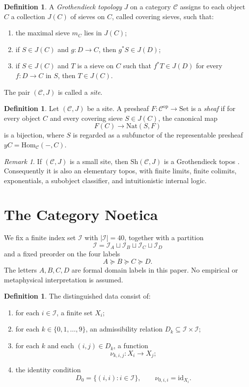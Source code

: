 \documentclass[11pt]{amsart}
\numberwithin{equation}{section}
\theoremstyle{definition}
\newtheorem{definition}[theorem]{Definition}
\theoremstyle{remark}
\newtheorem{remark}[theorem]{Remark}
\newcommand{\Sh}{\mathrm{Sh}}
\newcommand{\id}{\mathrm{id}}
\newcommand{\I}{\mathcal{I}}
\newcommand{\IA}{\mathcal{I}_A}
\newcommand{\IB}{\mathcal{I}_B}
\newcommand{\IC}{\mathcal{I}_C}
\newcommand{\ID}{\mathcal{I}_D}
\begin{document}
\begin{definition}
A \emph{Grothendieck topology} \(J\) on a category \(\mathcal{C}\) assigns to each object \(C\) a collection \(J(C)\) of sieves on \(C\), called covering sieves, such that:
\begin{enumerate}[label=(J\arabic*)]
\item \label{J1} the maximal sieve \(m_C\) lies in \(J(C)\);
\item \label{J2} if \(S \in J(C)\) and \(g : D \to C\), then \(g^{*}S \in J(D)\);
\item \label{J3} if \(S \in J(C)\) and \(T\) is a sieve on \(C\) such that \(f^{*}T \in J(D)\) for every \(f : D \to C\) in \(S\), then \(T \in J(C)\).
\end{enumerate}
The pair \((\mathcal{C},J)\) is called a \emph{site}.
\end{definition}

\begin{definition}
Let \((\mathcal{C},J)\) be a site. A presheaf \(F : \mathcal{C}^{\mathrm{op}} \to \mathrm{Set}\) is a \emph{sheaf} if for every object \(C\) and every covering sieve \(S \in J(C)\), the canonical map
\[
F(C) \longrightarrow \mathrm{Nat}(S,F)
\]
is a bijection, where \(S\) is regarded as a subfunctor of the representable presheaf \(yC = \mathrm{Hom}_{\mathcal{C}}(-,C)\).
\end{definition}

\begin{remark}
If \((\mathcal{C},J)\) is a small site, then \(\Sh(\mathcal{C},J)\) is a Grothendieck topos \cite[Chap.~VII]{MacLaneMoerdijk1992}. Consequently it is also an elementary topos, with finite limits, finite colimits, exponentials, a subobject classifier, and intuitionistic internal logic.
\end{remark}

\section{The Category Noetica}

We fix a finite index set \(\I\) with \(|\I|=40\), together with a partition
\[
\I = \IA \sqcup \IB \sqcup \IC \sqcup \ID
\]
and a fixed preorder on the four labels
\[
A \succeq B \succeq C \succeq D.
\]
The letters \(A,B,C,D\) are formal domain labels in this paper. No empirical or metaphysical interpretation is assumed.

\begin{definition}
The distinguished data consist of:
\begin{enumerate}[label=(\roman*)]
\item for each \(i \in \I\), a finite set \(X_i\);
\item for each \(k \in \{0,1,\dots,9\}\), an admissibility relation \(D_k \subseteq \I \times \I\);
\item for each \(k\) and each \((i,j) \in D_k\), a function
\[
\nu_{k,i,j} : X_i \to X_j;
\]
\item the identity condition
\[
D_0 = \{(i,i) : i \in \I\}, \qquad \nu_{0,i,i} = \id_{X_i}.
\]
\end{enumerate}
\end{definition}
\end{document}
